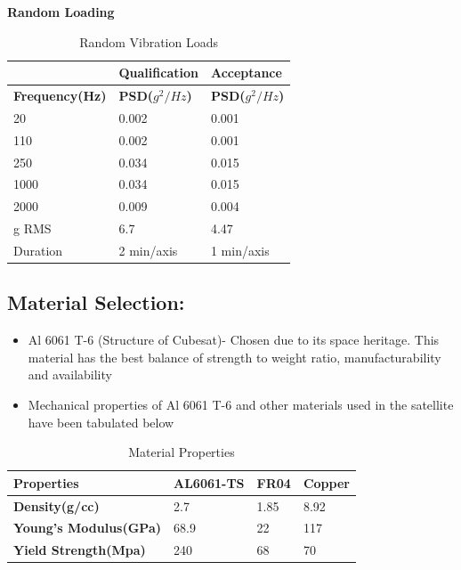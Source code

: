 \documentclass[../../main.tex]{subfiles}
\begin{document}
\textbf{Random Loading}

\begin{table}[H]
    \centering
    \begin{tabular}{ |p{3cm}|p{3cm}|p{3cm}| }
 \hline
    & \textbf{Qualification} & \textbf{Acceptance} \\
 \hline
\textbf{Frequency(Hz)} &  \textbf{PSD($g^2/Hz$)} &  \textbf{PSD($g^2/Hz$)} \\
\hline
20 & 0.002 & 0.001 \\
\hline
110 & 0.002 & 0.001 \\
\hline
250 & 0.034 & 0.015 \\
\hline
1000 & 0.034 & 0.015 \\
\hline
2000 & 0.009 & 0.004 \\
\hline
g RMS & 6.7 & 4.47 \\
\hline
Duration & 2 min/axis & 1 min/axis \\
\hline
 \end{tabular}
    \caption{Random Vibration Loads}
    \label{tab:my_label}
\end{table}
\subsection{Material Selection:}
\begin{itemize}
    \item Al 6061 T-6 (Structure of Cubesat)- Chosen due to its space heritage. This
material has the best balance of strength to weight ratio, manufacturability
and availability
    \item Mechanical properties of Al 6061 T-6 and other materials used in the satellite
have been tabulated below
\end{itemize}
    \begin{table}[h!]
        \centering
        \begin{tabular}{|p{5cm}|p{3cm}|p{3cm}|p{3cm}|}
             \hline
             \textbf{Properties} & \textbf{AL6061-TS} & \textbf{FR04} & \textbf{Copper}  \\
             \hline
             \textbf{Density(g/cc)} & 2.7 & 1.85 & 8.92\\
             \hline
             \textbf{Young’s Modulus(GPa)} & 68.9 & 22 & 117\\
             \hline
            \textbf{Yield Strength(Mpa)} & 240 & 68 & 70\\
            \hline
        \end{tabular}
        \caption{Material Properties}
        \label{tab:my_label}
    \end{table}
\end{document}
